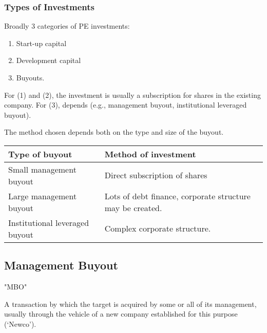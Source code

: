 \documentclass[
]{article}
\providecommand{\tightlist}{%
  \setlength{\itemsep}{0pt}\setlength{\parskip}{0pt}}
\newenvironment{env-2ef9ae75-52a0-4a7d-b210-64fd84055eb6}
{
    \savenotes\tcolorbox[blanker,breakable,left=5pt,borderline west={2pt}{-4pt}{gold}]
}
{
    \endtcolorbox\spewnotes
}
\begin{document}
\hypertarget{types-of-investments}{%
\subsubsection{Types of Investments}\label{types-of-investments}}

Broadly 3 categories of PE investments:

\begin{enumerate}
\tightlist
\item
  Start-up capital
\item
  Development capital
\item
  Buyouts.
\end{enumerate}

For (1) and (2), the investment is usually a subscription for shares in
the existing company. For (3), depends (e.g., management buyout,
institutional leveraged buyout).

The method chosen depends both on the type and size of the buyout.

\begin{longtable}[]{@{}ll@{}}
\toprule()
Type of buyout & Method of investment \\
\midrule()
\endhead
Small management buyout & Direct subscription of shares \\
Large management buyout & Lots of debt finance, corporate structure may
be created. \\
Institutional leveraged buyout & Complex corporate structure. \\
\bottomrule()
\end{longtable}

\hypertarget{management-buyout}{%
\subsection{Management Buyout}\label{management-buyout}}

\begin{env-2ef9ae75-52a0-4a7d-b210-64fd84055eb6}

"MBO"

A transaction by which the target is acquired by some or all of its
management, usually through the vehicle of a new company established for
this purpose (`Newco').

\end{env-2ef9ae75-52a0-4a7d-b210-64fd84055eb6}
\end{document}
